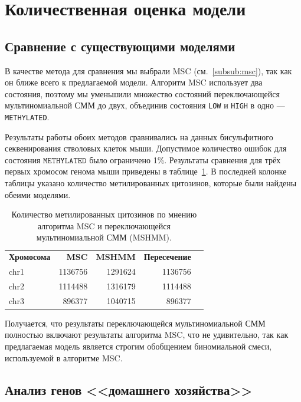 
\section{Количественная оценка модели}

\subsection{Сравнение с существующими моделями}
\label{sub:comparison}

В качестве метода для сравнения мы выбрали  MSC (см.~\ref{subsub:msc}), так как
он ближе всего к предлагаемой модели. Алгоритм MSC использует два состояния, поэтому
мы уменьшили множество состояний переключающейся мультиномиальной СММ до двух, объединив
состояния \texttt{LOW} и \texttt{HIGH} в одно --- \texttt{METHYLATED}.

Результаты работы обоих методов сравнивались на данных бисульфитного секвенирования
стволовых клеток мыши. Допустимое количество ошибок для состояния $\texttt{METHYLATED}$
было ограничено 1\%. Результаты сравнения для трёх первых хромосом генома мыши приведены в
таблице~\ref{table:comparison}. В последней колонке таблицы указано количество метилированных
цитозинов, которые были найдены обеими моделями.
\begin{table}[htbp!]
  \centering
  \begin{tabular}{lrrrr}
    \textbf{Хромосома} & \textbf{MSC} & \textbf{MSHMM} & \textbf{Пересечение} \\
    \noalign{\nobreak\smallskip}
    chr1 & 1136756 & 1291624 & 1136756 \\
    chr2 & 1114488 & 1316179 & 1114488 \\
    chr3 & 896377  & 1040715 & 896377
  \end{tabular}
  \caption{Количество метилированных цитозинов по мнению алгоритма MSC и
    переключающейся мультиномиальной СММ (MSHMM).}
  \label{table:comparison}
\end{table}

\vspace{-7pt}
Получается, что результаты переключающейся мультиномиальной СММ полностью
включают результаты алгоритма MSC, что не удивительно, так как предлагаемая модель
является строгим обобщением биномиальной смеси, используемой в алгоритме MSC.


\subsection{Анализ генов <<домашнего хозяйства>>}
\label{sub:housekeeping}

